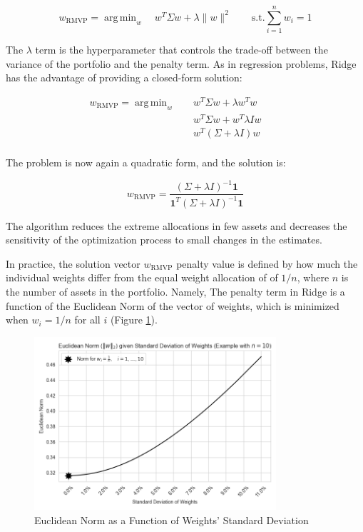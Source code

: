 \documentclass{article}
\DeclareMathOperator*{\argmin}{arg\,min}
\begin{document}
$$
w_{\text{RMVP}} = \argmin_{w} \quad w^{T} \Sigma w + \lambda \|w\|^{2} \quad \quad
\text{s.t.} \sum_{i=1}^{n} w_{i} = 1
$$

The $\lambda$ term is the hyperparameter that controls the trade-off between the variance of the portfolio and the penalty term. As in regression problems, Ridge has the advantage of providing a closed-form solution:

\begin{align*}
w_{\text{RMVP}} = \argmin_{w} & \quad w^{T} \Sigma w + \lambda w^T w \quad \quad \\
                & \quad w^{T} \Sigma w + w^T \lambda I w \quad \quad \\
                & \quad w^{T} (\Sigma + \lambda I) w \quad \quad \\
\end{align*}

The problem is now again a quadratic form, and the solution is:

$$
w_{\text{RMVP}} = \frac{(\Sigma + \lambda I)^{-1} \mathbf{1}}{\mathbf{1}^{T} (\Sigma + \lambda I)^{-1} \mathbf{1}}
$$

The algorithm reduces the extreme allocations in few assets and decreases the sensitivity of the optimization process to small changes in the estimates.

In practice, the solution vector $w_{\text{RMVP}}$ penalty value is defined by how much the individual weights differ from the equal weight allocation of of $1/n$, where $n$ is the number of assets in the portfolio. Namely, The penalty term in Ridge is a function of the Euclidean Norm of the vector of weights, which is minimized when $w_i = 1/n$ for all $i$ (Figure \ref{fig:euclidean_norm}).

\begin{figure}[h]
    \centering
    \includegraphics[width=0.8\textwidth]{graphics/illustrations/euclidean_norm.png}
    \caption{Euclidean Norm as a Function of Weights' Standard Deviation}
    \label{fig:euclidean_norm}
\end{figure}
\end{document}
